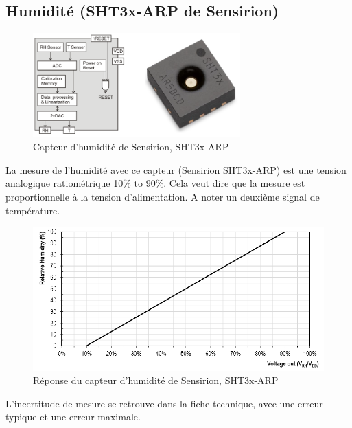 \subsection{Humidité (SHT3x-ARP de Sensirion)}
\begin{figure}[h!]
\centering
\includegraphics[width=8cm]{assets/figures/4_2_3_Humidite_SHT_3x_ARP.PNG}
\caption{Capteur d'humidité de Sensirion, SHT3x-ARP}
\label{fig:Humidite_SHT3x_ARP}
\end{figure}


La mesure de l'humidité avec ce capteur (Sensirion SHT3x-ARP) est une tension analogique ratiométrique 10\% to 90\%. Cela veut dire que la mesure est proportionnelle à la tension d'alimentation. A noter un deuxième signal de température.


\begin{figure}[h!]
\centering
\includegraphics[width=15cm]{assets/figures/4_2_3_Humidite_SHT_3x_ARP_reponse.PNG}
\caption{Réponse du capteur d'humidité de Sensirion, SHT3x-ARP}
\label{fig:Humidite_SHT3x_ARP_reponse}
\end{figure}

L'incertitude de mesure se retrouve dans la fiche technique, avec une erreur typique et une erreur maximale.



